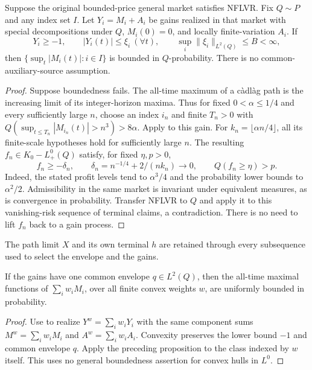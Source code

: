 \begin{proposition}\label{prop:indexed-maximal}
Suppose the original bounded-price general market satisfies NFLVR.
Fix $Q\sim P$ and any index set $I$. Let $Y_i=M_i+A_i$ be gains realized in
that market with special decompositions under $Q$, $M_i(0)=0$, and locally
finite-variation $A_i$. If
\[
 Y_i\geq-1,\qquad |Y_i(t)|\leq\xi_i\ (\forall t),\qquad
 \sup_i\|\xi_i\|_{L^2(Q)}\leq B<\infty,
\]
then $\{\sup_t|M_i(t)|:i\in I\}$ is bounded in $Q$-probability.
There is no common-auxiliary-source assumption.
\end{proposition}
\begin{proof}
Suppose boundedness fails. The all-time maximum of a c\`adl\`ag path is the increasing limit of its integer-horizon maxima.
Thus for fixed $0<\alpha\leq1/4$ and every sufficiently large $n$, choose an index $i_n$ and finite $T_n>0$
with $Q(\sup_{t\leq T_n}|M_{i_n}(t)|>n^3)>8\alpha$.
Apply  to this gain. For $k_n=\lfloor\alpha n/4\rfloor$, all its finite-scale hypotheses hold for sufficiently large $n$.
The resulting $f_n\in K_0-L^0_+(Q)$ satisfy, for fixed $\eta,p>0$,
\[
 f_n\geq-\delta_n,\qquad \delta_n=n^{-1/4}+2/(nk_n)\to0,
 \qquad Q(f_n\geq\eta)>p.
\]
Indeed, the stated profit levels tend to $\alpha^3/4$ and the probability lower bounds to $\alpha^2/2$.
Admissibility in the same market is invariant under equivalent measures, as is convergence in probability.
Transfer NFLVR to $Q$ and apply it to this vanishing-risk sequence of terminal claims, a contradiction.
There is no need to lift $f_n$ back to a gain process.
\end{proof}
The path limit $X$ and its own terminal $h$ are retained through every
subsequence used to select the envelope and the gains.
\begin{corollary}
If the gains have one common envelope $q\in L^2(Q)$, then the all-time maximal
functions of $\sum_iw_iM_i$, over all finite convex weights $w$, are uniformly
bounded in probability.
\end{corollary}
\begin{proof}
Use  to realize $Y^w=\sum_iw_iY_i$ with the same component sums
$M^w=\sum_iw_iM_i$ and $A^w=\sum_iw_iA_i$.
Convexity preserves the lower bound $-1$ and common envelope $q$.
Apply the preceding
proposition to the class indexed by $w$ itself. This uses no general
boundedness assertion for convex hulls in $L^0$.
\end{proof}

